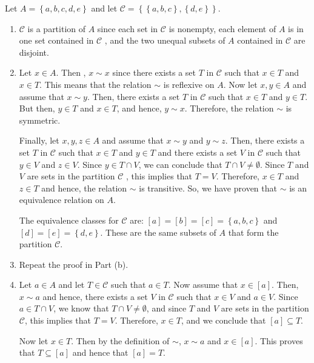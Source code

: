 \documentclass[11pt]{article}
\begin{document}
\noindent
Let  $A = \left\{ {a, b, c, d, e} \right\}$ and let  
$\mathcal{C} = \left\{ {\left\{ {a, b, c} \right\}, \left\{ {d, e} \right\}} \right\}$. 

\begin{enumerate}
\item $\mathcal{C}$ is a partition of $A$  since each set in  $\mathcal{C}$  is nonempty, each element of  $A$  is in one set contained in  $\mathcal{C}$ , and the two unequal subsets  of  $A$  contained in  $\mathcal{C}$  are disjoint.

\item Let  $x \in A$.  Then ,  $x \sim x$ since there exists a set  $T$  in  $\mathcal{C}$  such that  $x \in T$ and  $x \in T$.  This means that the relation  $\sim$  is reflexive on  $A$.
\vskip6pt
Now let  $x, y \in A$ and assume that  $x \sim y$.  Then, there exists a set  $T$  in  
$\mathcal{C}$  such that  $x \in T$ and  $y \in T$.  But then,  $y \in T$ and  $x \in T$, and hence,  $y \sim x$.  Therefore, the relation  $\sim$  is symmetric.
\vskip6pt

Finally, let  $x, y, z \in A$  and assume that  $x \sim y$  and  $y \sim z$.  Then, there exists a set  $T$  in  $\mathcal{C}$  such that  $x \in T$ and  $y \in T$  and  there exists a set  $V$  in  $\mathcal{C}$  such that  $y \in V$ and  $z \in V$.  Since  $y \in T \cap V$, we can conclude that  $T \cap V \ne \emptyset $.  Since  $T$  and  $V$  are sets in the partition  $\mathcal{C}$ , this implies that  $T = V$.  Therefore,  $x \in T$ and  $z \in T$ and hence, the relation  $\sim$  is transitive. So, we have proven that  $\sim$  is an equivalence relation on  $A$.
\vskip6pt

The equivalence classes for $\mathcal{C}$ are:  $\left[ a \right] = \left[ b \right] = \left[ c \right] = \left\{ {a, b, c} \right\}$  and   
$\left[ d \right] = \left[ e \right] = \left\{ {d, e} \right\}$.  These are the same subsets of 
$A$ that form the partition $\mathcal{C}$.


\item Repeat the proof in Part (b).

\item Let  $a \in A$  and let  $T \in \mathcal{C}$ such that  $a \in T$.  Now assume that  
$x \in \left[ a \right]$.  Then,  $x \sim a$ and hence,  there exists a set  $V$  in  
$\mathcal{C}$  such that  $x \in V$ and  $a \in V$.  Since  $a \in T \cap V$, we know that  
$T \cap V \ne \emptyset $, and  since  $T$  and  $V$  are sets in the partition  $\mathcal{C}$, this implies that  $T = V$.   Therefore, $x \in T$, and we conclude that  
$\left[ a \right] \subseteq T$.

Now let  $x \in T$.  Then by the definition of  $\sim$,  $x \sim a$ and  
$x \in \left[ a \right]$.  This proves that  $T \subseteq \left[ a \right]$ and hence that  
$\left[ a \right] = T$.
\end{enumerate}
\end{document}
